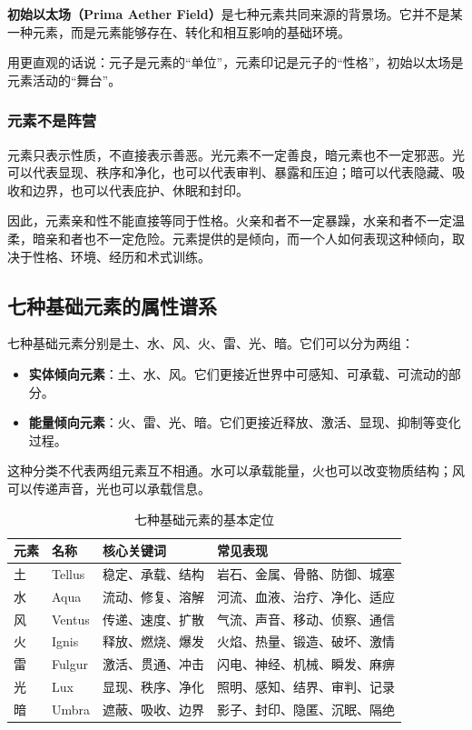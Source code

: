 \begin{definition}[初始以太场]
    \textbf{初始以太场（Prima Aether Field）}是七种元素共同来源的背景场。它并不是某一种元素，而是元素能够存在、转化和相互影响的基础环境。
\end{definition}

用更直观的话说：元子是元素的“单位”，元素印记是元子的“性格”，初始以太场是元素活动的“舞台”。

\subsubsection{元素不是阵营}

元素只表示性质，不直接表示善恶。光元素不一定善良，暗元素也不一定邪恶。光可以代表显现、秩序和净化，也可以代表审判、暴露和压迫；暗可以代表隐藏、吸收和边界，也可以代表庇护、休眠和封印。

因此，元素亲和性不能直接等同于性格。火亲和者不一定暴躁，水亲和者不一定温柔，暗亲和者也不一定危险。元素提供的是倾向，而一个人如何表现这种倾向，取决于性格、环境、经历和术式训练。

\subsection{七种基础元素的属性谱系}\label{subsec:elementproperties}

七种基础元素分别是土、水、风、火、雷、光、暗。它们可以分为两组：
\begin{itemize}
    \item \textbf{实体倾向元素}：土、水、风。它们更接近世界中可感知、可承载、可流动的部分。
    \item \textbf{能量倾向元素}：火、雷、光、暗。它们更接近释放、激活、显现、抑制等变化过程。
\end{itemize}

这种分类不代表两组元素互不相通。水可以承载能量，火也可以改变物质结构；风可以传递声音，光也可以承载信息。

\begin{table}[htbp]
    \centering
    \caption{七种基础元素的基本定位}
    \label{tab:element-basic}
    \begin{tabular}{llll}
        \toprule
        \textbf{元素} & \textbf{名称} & \textbf{核心关键词} & \textbf{常见表现} \\
        \midrule
        土 & Tellus & 稳定、承载、结构 & 岩石、金属、骨骼、防御、城塞 \\
        水 & Aqua & 流动、修复、溶解 & 河流、血液、治疗、净化、适应 \\
        风 & Ventus & 传递、速度、扩散 & 气流、声音、移动、侦察、通信 \\
        火 & Ignis & 释放、燃烧、爆发 & 火焰、热量、锻造、破坏、激情 \\
        雷 & Fulgur & 激活、贯通、冲击 & 闪电、神经、机械、瞬发、麻痹 \\
        光 & Lux & 显现、秩序、净化 & 照明、感知、结界、审判、记录 \\
        暗 & Umbra & 遮蔽、吸收、边界 & 影子、封印、隐匿、沉眠、隔绝 \\
        \bottomrule
    \end{tabular}
\end{table}

